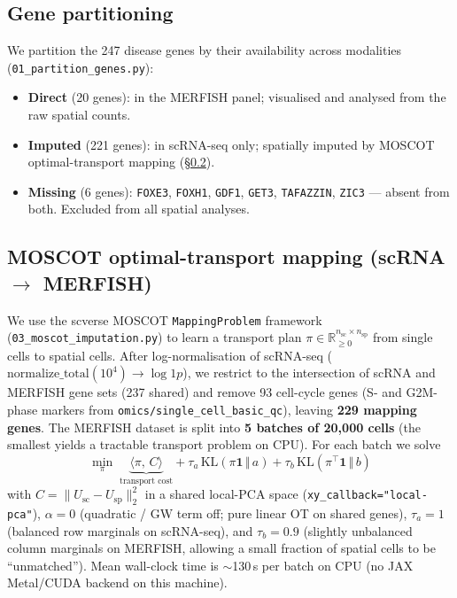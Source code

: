 \documentclass[11pt,a4paper]{article}
\begin{document}
\subsection{Gene partitioning}
\label{sec:methods:partition}
We partition the 247 disease genes by their availability across
modalities (\texttt{01\_partition\_genes.py}):
\begin{itemize}[leftmargin=*,itemsep=1pt]
    \item \textbf{Direct} (20 genes): in the MERFISH panel; visualised
          and analysed from the raw spatial counts.
    \item \textbf{Imputed} (221 genes): in scRNA-seq only; spatially
          imputed by MOSCOT optimal-transport mapping
          (\S\ref{sec:methods:moscot}).
    \item \textbf{Missing} (6 genes): \texttt{FOXE3}, \texttt{FOXH1},
          \texttt{GDF1}, \texttt{GET3}, \texttt{TAFAZZIN}, \texttt{ZIC3}
          --- absent from both. Excluded from all spatial analyses.
\end{itemize}

\subsection{MOSCOT optimal-transport mapping (scRNA $\to$ MERFISH)}
\label{sec:methods:moscot}

We use the scverse MOSCOT \texttt{MappingProblem} framework
(\texttt{03\_moscot\_imputation.py}) to learn a transport plan
$\pi \in \mathbb{R}_{\geq 0}^{n_{\text{sc}} \times n_{\text{sp}}}$ from
single cells to spatial cells. After log-normalisation of scRNA-seq
($\mathrm{normalize\_total}(10^4) \to \log\!1\!p$), we restrict to the
intersection of scRNA and MERFISH gene sets (237 shared) and remove
93 cell-cycle genes (S- and G2M-phase markers from
\texttt{omics/single\_cell\_basic\_qc}), leaving \textbf{229 mapping
genes}. The MERFISH dataset is split into \textbf{5 batches of 20{,}000
cells} (the smallest yields a tractable transport problem on CPU).
For each batch we solve
\[
\min_{\pi} \;
\underbrace{\langle \pi,\, C \rangle}_{\text{transport cost}}
+ \tau_a \, \mathrm{KL}\!\left(\pi \mathbf{1} \,\Vert\, a\right)
+ \tau_b \, \mathrm{KL}\!\left(\pi^{\!\top} \mathbf{1} \,\Vert\, b\right)
\]
with $C = \lVert U_{\text{sc}} - U_{\text{sp}}\rVert_2^2$ in a shared
local-PCA space (\texttt{xy\_callback="local-pca"}), $\alpha = 0$
(quadratic / GW term off; pure linear OT on shared genes),
$\tau_a = 1$ (balanced row marginals on scRNA-seq), and
$\tau_b = 0.9$ (slightly unbalanced column marginals on MERFISH, allowing
a small fraction of spatial cells to be ``unmatched''). Mean wall-clock
time is $\sim$130\,s per batch on CPU (no JAX Metal/CUDA backend on this
machine).
\end{document}
